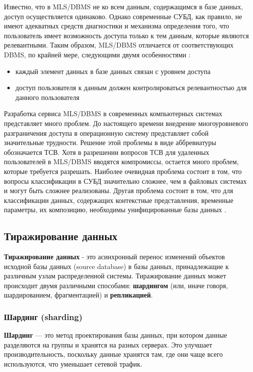 Известно, что в MLS/DBMS не ко всем данным, содержащимся в  базе
данных, доступ осуществляется одинаково. Однако современные СУБД, как
правило,  не имеют адекватных средств диагностики и механизма определения
того, что пользователь имеет возможность доступа только  к  тем
данным,  которые являются релевантными. Таким образом, MLS/DBMS отличается
от соответствующих DBMS,  по крайней  мере,  следующими  двумя
особенностями \autocite{SecureFix}:
\begin{itemize}
    \item каждый элемент данных в базе данных связан с уровнем доступа
    \item доступ пользователя к данным должен контролироваться релевантностью для данного пользователя
\end{itemize}
Разработка сервиса MLS/DBMS в современных компьютерных  системах
представляет  много  проблем. До настоящего времени внедрение многоуровневого
разграничения доступа в операционную  систему  представляет
собой  значительные трудности. Решение этой проблемы в виде аббревиатуры
обозначается ТСВ. Хотя в разрешении вопросов ТСВ  для  удаленных
пользователей  в  MLS/DBMS вводятся компромиссы, остается много проблем,
которые требуется разрешать. Наиболее очевидная проблема состоит
в том, что вопросы классификации в СУБД значительно  сложнее,  чем  в
файловых  системах  и могут быть сложнее реализованы. Другая проблема
состоит в том, что для классификации данных,  содержащих  контекстные
представления,  временные параметры, их композицию, необходимы унифицированные базы данных \autocite{SecureFix}.

\subsection{Тиражирование данных}

\textbf{Тиражирование данных} - это асинхронный перенос изменений объектов исходной базы данных (source database)
в базы данных, принадлежащие к различным узлам распределенной системы. Тиражирование данных может происходит
двумя различными способами: \textbf{шардингом} (или, иначе говоря, шардированием, фрагментацией) и \textbf{репликацией}.

\subsubsection{Шардинг (sharding)}

\textbf{Шардинг} — это метод проектирования базы данных, при котором данные разделяются на группы и хранятся на разных серверах. Это улучшает производительность, поскольку данные хранятся там, где они чаще всего используются, что уменьшает сетевой трафик.


